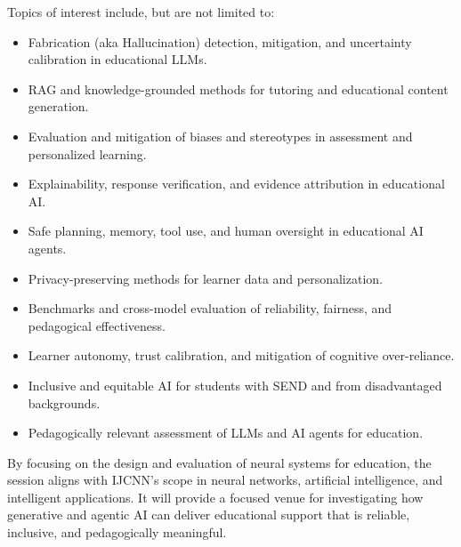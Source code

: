 \documentclass{article}
\begin{document}
Topics of interest include, but are not limited to:
\begin{itemize}
    \item Fabrication (aka Hallucination) detection, mitigation, and uncertainty calibration in educational LLMs.
    \item RAG and knowledge-grounded methods for tutoring and educational content generation.
    \item Evaluation and mitigation of biases and stereotypes in assessment and personalized learning.
    \item Explainability, response verification, and evidence attribution in educational AI.
    \item Safe planning, memory, tool use, and human oversight in educational AI agents.
    \item Privacy-preserving methods for learner data and personalization.
    \item Benchmarks and cross-model evaluation of reliability, fairness, and pedagogical effectiveness.
    \item Learner autonomy, trust calibration, and mitigation of cognitive over-reliance.
    \item Inclusive and equitable AI for students with SEND and from disadvantaged backgrounds.
    \item Pedagogically relevant assessment of LLMs and AI agents for education.
\end{itemize}

By focusing on the design and evaluation of neural systems for education, the session aligns with IJCNN’s scope in neural networks, artificial intelligence, and intelligent applications. It will provide a focused venue for investigating how generative and agentic AI can deliver educational support that is reliable, inclusive, and pedagogically meaningful.
\end{document}
